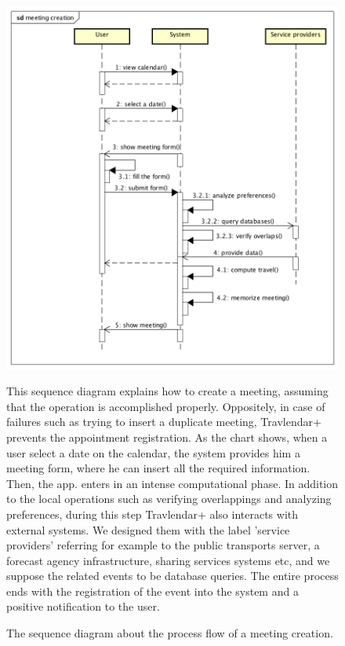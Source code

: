 \begin{figure}
	\centering
	\includegraphics[width=0.7\linewidth]{sequencediagrams/meetingcreation}
	\caption{The sequence diagram about the process flow of a meeting creation.}
	\label{fig:meetingcreation}
	\begin{center}
		This sequence diagram explains how to create a meeting, assuming that the operation is accomplished properly. Oppositely,
		in case of failures such as trying to insert a duplicate meeting, Travlendar+ prevents the appointment registration. 
		As the chart shows, when a user select a date on the calendar, the system provides him a meeting form, where he can insert all the required information. Then, the app. enters in an intense computational phase. In addition to the local operations such as verifying overlappings and analyzing preferences, during this step Travlendar+ also interacts with external systems. 
		We designed them with the label 'service providers' referring for example to the public transports server, a forecast agency infrastructure, sharing services systems etc, and we suppose the related events to be database queries. 
		The entire process ends with the registration of the event into the system and a positive notification to the user. 
		
	\end{center}
\end{figure}

